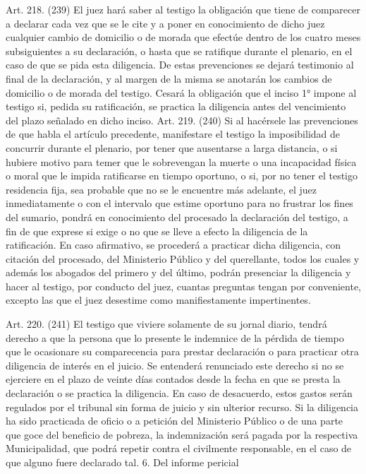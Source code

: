    Art. 218. (239) El juez hará saber al testigo la obligación que tiene de comparecer a declarar cada vez que se le cite y a poner en conocimiento de dicho juez cualquier cambio de domicilio o de morada que efectúe dentro de los cuatro meses subsiguientes a su declaración, o hasta que se ratifique durante el plenario, en el caso de que se pida esta diligencia.
    De estas prevenciones se dejará testimonio al final de la declaración, y al margen de la misma se anotarán los cambios de domicilio o de morada del testigo.
    Cesará la obligación que el inciso 1° impone al testigo si, pedida su ratificación, se practica la diligencia antes del vencimiento del plazo señalado en dicho inciso.
    Art. 219. (240) Si al hacérsele las prevenciones de que habla el artículo precedente, manifestare el testigo la imposibilidad de concurrir durante el plenario, por tener que ausentarse a larga distancia, o si hubiere motivo para temer que le sobrevengan la muerte o una incapacidad física o moral que le impida ratificarse en tiempo oportuno, o si, por no tener el testigo residencia fija, sea probable que no se le encuentre más adelante, el juez inmediatamente o con el intervalo que estime oportuno para no frustrar los fines del sumario, pondrá en conocimiento del procesado la declaración del testigo, a fin de que exprese si exige o no que se lleve a efecto la diligencia de la ratificación.
    En caso afirmativo, se procederá a practicar dicha diligencia, con citación del procesado, del Ministerio Público y del querellante, todos los cuales y además los abogados del primero y del último, podrán presenciar la diligencia y hacer al testigo, por conducto del juez, cuantas preguntas tengan por conveniente, excepto las que el juez desestime como manifiestamente impertinentes.


    Art. 220. (241) El testigo que viviere solamente de su jornal diario, tendrá derecho a que la persona que lo presente le indemnice de la pérdida de tiempo que le ocasionare su comparecencia para prestar declaración o para practicar otra diligencia de interés en el juicio.
    Se entenderá renunciado este derecho si no se ejerciere en el plazo de veinte días contados desde la fecha en que se presta la declaración o se practica la diligencia.
    En caso de desacuerdo, estos gastos serán regulados por el tribunal sin forma de juicio y sin ulterior recurso.
    Si la diligencia ha sido practicada de oficio o a petición del Ministerio Público o de una parte que goce del beneficio de pobreza, la indemnización será pagada por la respectiva Municipalidad, que podrá repetir contra el civilmente responsable, en el caso de que alguno fuere declarado tal.
    6. Del informe pericial

